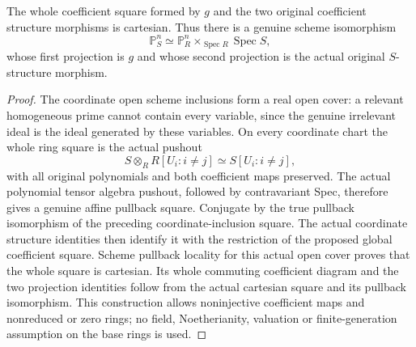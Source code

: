 \begin{theorem}
\label{projective:actual-polynomial-proj-base-change}
\leanok
{}
The whole coefficient square formed by $g$ and the two original coefficient
structure morphisms is cartesian. Thus there is a genuine scheme
isomorphism
\[
 \mathbb P^n_S\simeq
 \mathbb P^n_R\times_{\operatorname{Spec}R}\operatorname{Spec}S,
\]
whose first projection is $g$ and whose second projection is the actual
original $S$-structure morphism.
\end{theorem}
\begin{proof}
The coordinate open scheme inclusions form a real open cover: a relevant
homogeneous prime cannot contain every variable, since the genuine
irrelevant ideal is the ideal generated by these variables. On every
coordinate chart the whole ring square is the actual pushout
\[
 S\otimes_R R[U_i:i\ne j]\simeq S[U_i:i\ne j],
\]
with all original polynomials and both coefficient maps preserved. The
actual polynomial tensor algebra pushout, followed by contravariant Spec,
therefore gives a genuine affine pullback square. Conjugate by the true
pullback isomorphism of the preceding coordinate-inclusion square. The
actual coordinate structure identities then identify it with the restriction
of the proposed global coefficient square. Scheme pullback locality for this
actual open cover proves that the whole square is cartesian. Its whole
commuting coefficient diagram and the two projection identities follow from
the actual cartesian square and its pullback isomorphism. This construction
allows noninjective coefficient maps and nonreduced or zero rings; no field,
Noetherianity, valuation or finite-generation assumption on the base rings is
used.
\end{proof}

